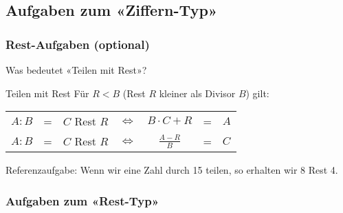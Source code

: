 \subsection*{Aufgaben zum «Ziffern-Typ»}



\newpage

\subsubsection{Rest-Aufgaben (optional)}


Was bedeutet «Teilen mit Rest»?


\begin{gesetz}{Teilen mit Rest}{}
  Für $R<B$ (Rest $R$ kleiner als Divisor $B$) gilt:

  \vspace{7mm}

  \begin{tabular}{rcccccl}
  $A:B$ & = & $C$ Rest $R$ & $\Longleftrightarrow$ & $B\cdot{}C+R$ & = & $A$ \\
  $A:B$ & = & $C$ Rest $R$ & $\Longleftrightarrow$ & $\frac{A-R}{B}$ & = & $C$ \\
\end{tabular}
\end{gesetz}

  Referenzaufgabe: Wenn wir eine Zahl durch 15 teilen, so erhalten wir
  8 Rest 4.



\subsubsection*{Aufgaben zum «Rest-Typ»}

\newpage

